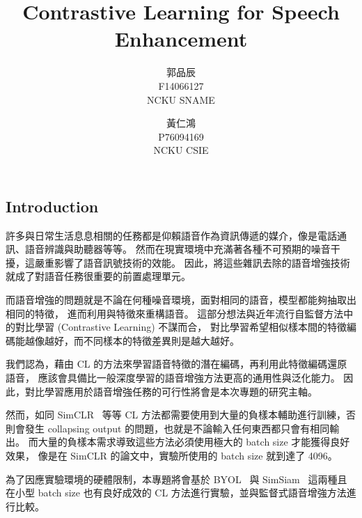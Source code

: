 \documentclass[10pt,twocolumn,letterpaper]{article}
\begin{document}
\begin{CJK}{UTF8}{bkai}
   \title{Contrastive Learning for Speech Enhancement}

   \author{郭品辰\\
      F14066127\\
      NCKU SNAME
      \and
      黃仁鴻\\
      P76094169\\
      NCKU CSIE}

   \maketitle

   \section{Introduction}

   許多與日常生活息息相關的任務都是仰賴語音作為資訊傳遞的媒介，像是電話通訊、語音辨識與助聽器等等。
   然而在現實環境中充滿著各種不可預期的噪音干擾，這嚴重影響了語音訊號技術的效能。
   因此，將這些雜訊去除的語音增強技術就成了對語音任務很重要的前置處理單元。

   而語音增強的問題就是不論在何種噪音環境，面對相同的語音，模型都能夠抽取出相同的特徵，
   進而利用與特徵來重構語音。
   這部分想法與近年流行自監督方法中的對比學習 (Contrastive Learning) 不謀而合，
   對比學習希望相似樣本間的特徵編碼能越像越好，而不同樣本的特徵差異則是越大越好。

   我們認為，藉由 CL 的方法來學習語音特徵的潛在編碼，再利用此特徵編碼還原語音，
   應該會具備比一般深度學習的語音增強方法更高的通用性與泛化能力。
   因此，對比學習應用於語音增強任務的可行性將會是本次專題的研究主軸。

   然而，如同 SimCLR~\cite{SimCLR} 等等 CL 方法都需要使用到大量的負樣本輔助進行訓練，否則會發生
   collapsing output 的問題，也就是不論輸入任何東西都只會有相同輸出。
   而大量的負樣本需求導致這些方法必須使用極大的 batch size 才能獲得良好效果，
   像是在 SimCLR 的論文中，實驗所使用的 batch size 就到達了 4096。

   為了因應實驗環境的硬體限制，本專題將會基於 BYOL~\cite{BYOL} 與
   SimSiam~\cite{SimSiam}
   這兩種且在小型 batch size 也有良好成效的 CL 方法進行實驗，並與監督式語音增強方法進行比較。


\end{CJK}
\end{document}
